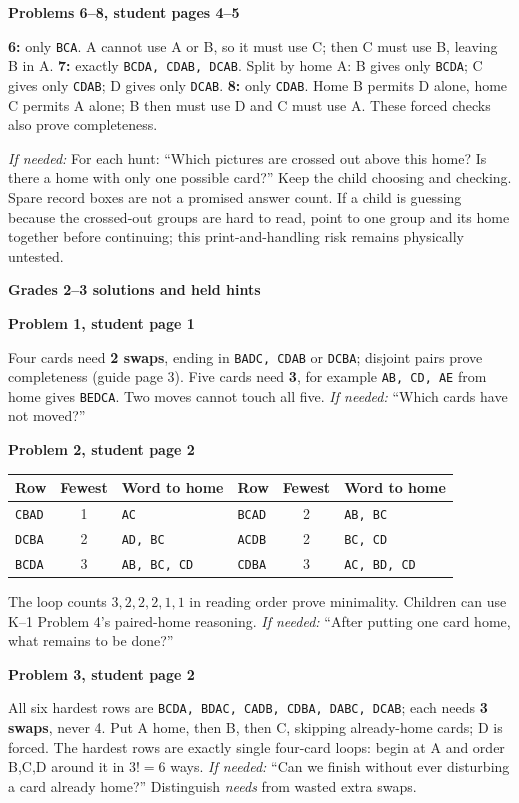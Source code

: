 \documentclass[11pt]{article}
\newcommand{\head}[1]{\par\textbf{\large #1}\par}
\newcommand{\sub}[1]{\par\textbf{#1}\par}
\newcommand{\row}[1]{\texttt{#1}}
\newcommand{\hint}[1]{\emph{If needed:} #1}
\begin{document}
\sub{Problems 6--8, student pages 4--5}
\textbf{6:} only \row{BCA}. A cannot use A or B, so it must use C; then C must use B, leaving B in A. \textbf{7:} exactly \row{BCDA, CDAB, DCAB}. Split by home A: B gives only \row{BCDA}; C gives only \row{CDAB}; D gives only \row{DCAB}. \textbf{8:} only \row{CDAB}. Home B permits D alone, home C permits A alone; B then must use D and C must use A. These forced checks also prove completeness.

\hint{For each hunt: ``Which pictures are crossed out above this home? Is there a home with only one possible card?''} Keep the child choosing and checking. Spare record boxes are not a promised answer count. If a child is guessing because the crossed-out groups are hard to read, point to one group and its home together before continuing; this print-and-handling risk remains physically untested.
\newpage
\head{Grades 2--3 solutions and held hints}
\sub{Problem 1, student page 1}
Four cards need \textbf{2 swaps}, ending in \row{BADC, CDAB} or \row{DCBA}; disjoint pairs prove completeness (guide page 3). Five cards need \textbf{3}, for example \row{AB, CD, AE} from home gives \row{BEDCA}. Two moves cannot touch all five. \hint{``Which cards have not moved?''}

\sub{Problem 2, student page 2}
\begin{center}\small\renewcommand{\arraystretch}{1.1}
\begin{tabular}{lcl@{\qquad}lcl}
Row & Fewest & Word to home & Row & Fewest & Word to home\\\midrule
\row{CBAD}&1&\row{AC}&\row{BCAD}&2&\row{AB, BC}\\
\row{DCBA}&2&\row{AD, BC}&\row{ACDB}&2&\row{BC, CD}\\
\row{BCDA}&3&\row{AB, BC, CD}&\row{CDBA}&3&\row{AC, BD, CD}
\end{tabular}
\end{center}
The loop counts $3,2,2,2,1,1$ in reading order prove minimality. Children can use K--1 Problem 4's paired-home reasoning. \hint{``After putting one card home, what remains to be done?''}

\sub{Problem 3, student page 2}
All six hardest rows are \row{BCDA, BDAC, CADB, CDBA, DABC, DCAB}; each needs \textbf{3 swaps}, never 4. Put A home, then B, then C, skipping already-home cards; D is forced. The hardest rows are exactly single four-card loops: begin at A and order B,C,D around it in $3!=6$ ways. \hint{``Can we finish without ever disturbing a card already home?''} Distinguish \emph{needs} from wasted extra swaps.
\end{document}
